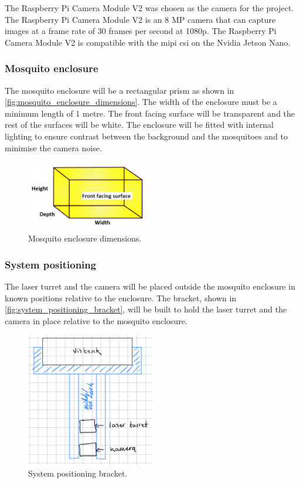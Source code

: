 The Raspberry Pi Camera Module V2 was chosen as the camera for the project. The Raspberry Pi Camera Module V2 is an 8 MP camera that can capture images at a frame rate of 30 frames per second at 1080p. The Raspberry Pi Camera Module V2 is compatible with the \gls{mipi} \gls{csi} on the Nvidia Jetson Nano.



\subsubsection{Mosquito enclosure}
The mosquito enclosure will be a rectangular prism as shown in \autoref{fig:mosquito_enclosure_dimensions}. The width of the enclosure must be a minimum length of 1 metre. The front facing surface will be transparent and the rest of the surfaces will be white. The enclosure will be fitted with internal lighting to ensure contrast between the background and the mosquitoes and to minimise the camera noise.

\begin{figure}[h]
    \centering
    \includegraphics[width=0.5\textwidth]{figures/hardware_design/rectangular_prism.png}
    \caption{Mosquito enclosure dimensions.}
    \label{fig:mosquito_enclosure_dimensions}
\end{figure}


\subsubsection{System positioning}
The laser turret and the camera will be placed outside the mosquito enclosure in known positions relative to the enclosure. The bracket, shown in \autoref{fig:system_positioning_bracket}, will be built to hold the laser turret and the camera in place relative to the mosquito enclosure.

\begin{figure}[h]
    \centering
    \includegraphics[width=0.5\textwidth]{figures/hardware_design/positioning_bracket.png}
    \caption{System positioning bracket.}
    \label{fig:system_positioning_bracket}
\end{figure}



